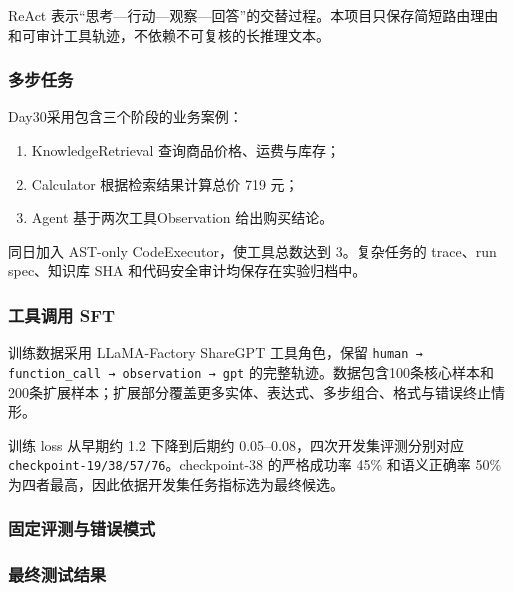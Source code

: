 \documentclass[UTF8,fontset=fandol,a4paper,11pt]{ctexart}
\providecommand{\tightlist}{\setlength{\itemsep}{0pt}\setlength{\parskip}{0pt}}
\begin{document}
ReAct
表示``思考---行动---观察---回答''的交替过程。本项目只保存简短路由理由和可审计工具轨迹，不依赖不可复核的长推理文本。

\subsubsection{多步任务}\label{ux591aux6b65ux4efbux52a1}

Day30采用包含三个阶段的业务案例：

\begin{enumerate}
\def\labelenumi{\arabic{enumi}.}
\tightlist
\item
  KnowledgeRetrieval 查询商品价格、运费与库存；
\item
  Calculator 根据检索结果计算总价 719 元；
\item
  Agent 基于两次工具Observation 给出购买结论。
\end{enumerate}

同日加入 AST-only CodeExecutor，使工具总数达到 3。复杂任务的 trace、run
spec、知识库 SHA 和代码安全审计均保存在实验归档中。

\subsubsection{工具调用 SFT}\label{ux5de5ux5177ux8c03ux7528-sft}

训练数据采用 LLaMA-Factory ShareGPT 工具角色，保留
\nolinkurl{human → function_call → observation → gpt}
的完整轨迹。数据包含100条核心样本和200条扩展样本；扩展部分覆盖更多实体、表达式、多步组合、格式与错误终止情形。

训练 loss 从早期约 1.2 下降到后期约 0.05--0.08，四次开发集评测分别对应
{\nolinkurl{checkpoint-19/38/57/76}。checkpoint-38} 的严格成功率 45\%
和语义正确率 50\% 为四者最高，因此依据开发集任务指标选为最终候选。

\Needspace{365pt}

\subsubsection{固定评测与错误模式}\label{ux56faux5b9aux8bc4ux6d4bux4e0eux9519ux8befux6a21ux5f0f}

\subsubsection{最终测试结果}\label{ux6700ux7ec8ux6d4bux8bd5ux7ed3ux679c}
\end{document}
